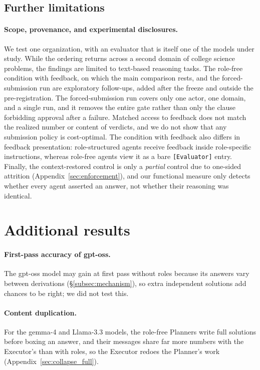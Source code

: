 \subsection{Further limitations}

\paragraph{Scope, provenance, and experimental disclosures.} We test one
\PER{} organization, with an evaluator that is itself one of the models
under study. While the ordering returns across a second domain of college
science problems, the findings are limited to text-based reasoning tasks.
The role-free condition with feedback, on which the main comparison rests,
and the forced-submission run are exploratory follow-ups, added after the
freeze and outside the pre-registration. The forced-submission
run covers only one actor, one domain, and a single run, and it removes the
entire gate rather than only the clause forbidding approval after a failure.
Matched access to feedback does not match the realized number or content
of verdicts, and we do not show that any submission policy is cost-optimal.
The condition with feedback also differs in feedback presentation:
role-structured agents receive feedback inside role-specific instructions,
whereas role-free agents view it as a bare \texttt{[Evaluator]} entry.
Finally, the context-restored control is only a \emph{partial} control due
to one-sided attrition (Appendix~\ref{sec:enforcement}), and our functional measure
only detects whether every agent asserted an answer, not whether their
reasoning was identical.

\section{Additional results}
\label{app:results}

\paragraph{First-pass accuracy of gpt-oss.} The gpt-oss model may gain
at first pass without roles because its answers vary between derivations
(\S\ref{subsec:mechanism}), so extra independent solutions add chances to be
right; we did not test this.

\paragraph{Content duplication.} For the gemma-4 and
Llama-3.3 models, the role-free Planners write full solutions before boxing
an answer, and their messages share far more numbers with the Executor's
than with roles, so the Executor redoes the Planner's work (Appendix~\ref{sec:collapse_full}). 



